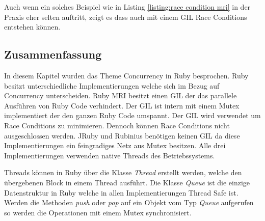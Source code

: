 Auch wenn ein solches Beispiel wie in Listing \ref{listing:race condition mri} in der Praxis eher selten auftritt, zeigt es dass auch mit einem GIL Race Conditions entstehen können.

\subsection{Zusammenfassung}
In diesem Kapitel wurden das Theme Concurrency in Ruby besprochen. Ruby besitzt unterschiedliche Implementierungen welche sich im Bezug auf Concurrency unterscheiden. Ruby MRI besitzt einen GIL der das parallele Ausführen von Ruby Code verhindert. Der GIL ist intern mit einem Mutex implementiert der den ganzen Ruby Code umspannt. Der GIL wird verwendet um Race Conditions zu minimieren. Dennoch können Race Conditions nicht ausgeschlossen werden. JRuby und Rubinius benötigen keinen GIL da diese Implementierungen ein feingradiges Netz aus Mutex besitzen. Alle drei Implementierungen verwenden native Threads des Betriebssystems. 

Threads können in Ruby über die Klasse \emph{Thread} erstellt werden, welche den übergebenen Block in einem Thread ausführt. Die Klasse \emph{Queue} ist die einzige Datenstruktur in Ruby welche in allen Implementierungen Thread Safe ist. Werden die Methoden \emph{push} oder \emph{pop} auf ein Objekt vom Typ \emph{Queue} aufgerufen so werden die Operationen mit einem Mutex synchronisiert. 